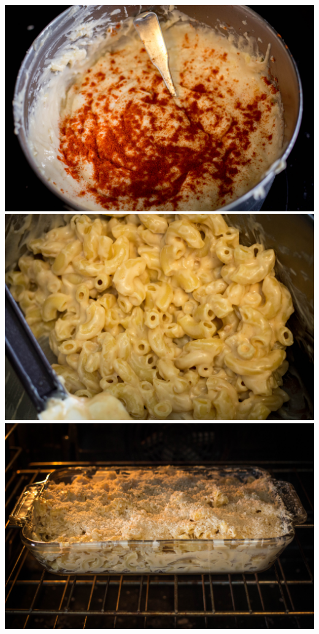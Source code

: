 \newpage
\includegraphics[width=\textwidth]{food/mac-n-cheese/images/hi-res/12.jpg}
\newpage
\includegraphics[width=\textwidth]{food/mac-n-cheese/images/hi-res/13.jpg}
\newpage
\includegraphics[width=\textwidth]{food/mac-n-cheese/images/hi-res/14.jpg}
